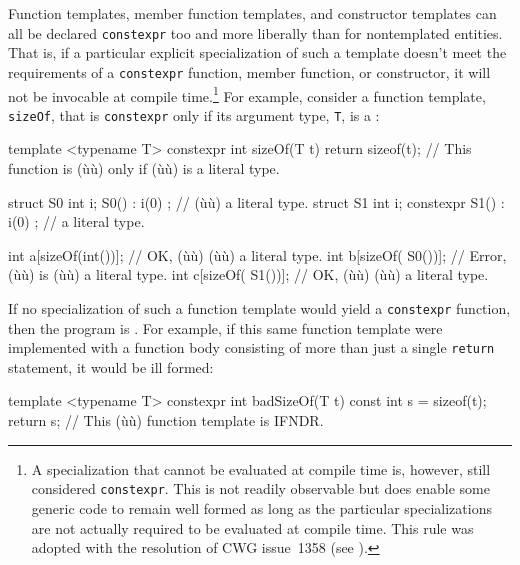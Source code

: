 Function templates, member function templates, and constructor templates
can all be declared \lstinline!constexpr! too and more liberally than for
nontemplated entities. That is, if a particular explicit specialization
of such a template doesn't meet the requirements of a \lstinline!constexpr!
function, member function, or constructor, it will not be invocable at
compile time.{\cprotect\footnote{A specialization that cannot be
evaluated at compile time is, however, still considered
\lstinline!constexpr!. This is not readily observable but does enable
some generic code to remain well formed as long as the particular
specializations are not actually required to be evaluated at compile
time. This rule was adopted with the resolution of CWG issue~1358 (see
  \cite{smith11}).}} For example, consider a function
template, \lstinline!sizeOf!, that is \lstinline!constexpr! only if its
argument type, \lstinline!T!, is a :

\begin{emcppslisting}[emcppsbatch=e7]
template <typename T> constexpr int sizeOf(T t) { return sizeof(t); }
    // This function is (ù{}ù) only if (ù{}ù) is a literal type.

struct S0 { int i;           S0() : i(0) { } };  // (ù{}ù) a literal type.
struct S1 { int i; constexpr S1() : i(0) { } };  // a literal type.

int a[sizeOf(int())];  // OK,    (ù{}ù) (ù{}ù)     a literal type.
int b[sizeOf( S0())];  // Error,  (ù{}ù) is (ù{}ù) a literal type.
int c[sizeOf( S1())];  // OK,     (ù{}ù) (ù{}ù)     a literal type.
\end{emcppslisting}


\noindent If no specialization of such a function template would yield a
\lstinline!constexpr! function, then the program is . For
example, if this same function template were implemented with a function
body consisting of more than just a single \lstinline!return! statement, it
would be ill formed:

\begin{emcppslisting}[emcppsbatch=e7,emcppsignore={IFNDR, clang c++11 catches this}]
template <typename T>
constexpr int badSizeOf(T t) { const int s = sizeof(t); return s; }
    // This (ù{}ù) function template is IFNDR.
\end{emcppslisting}


